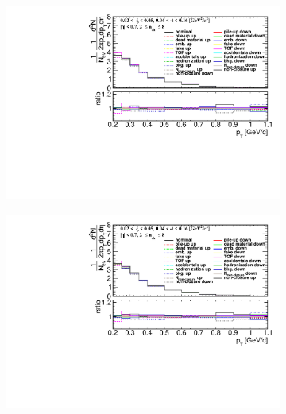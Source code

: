 \begin{figure}[h!]
	\centering
	\vspace{-2.5cm}
	\begin{subfigure}{.49\textwidth}
		\includegraphics[width=\textwidth,page=5]{chapters/chrgSTAR/img/syst/out_chargedmax.pdf}
	\end{subfigure}
	\begin{subfigure}{.49\textwidth}
		\includegraphics[width=\textwidth,page=11]{chapters/chrgSTAR/img/syst/out_chargedmax.pdf}
	\end{subfigure}
	\begin{subfigure}{.49\textwidth}

\end{subfigure}
\end{figure}
